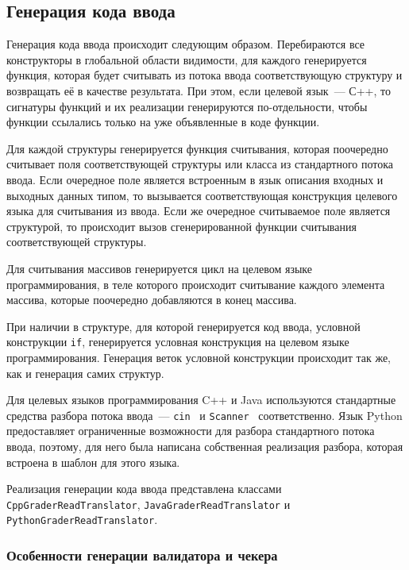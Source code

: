 \documentclass[times,specification,annotation]{style/itmo-student-thesis/itmo-student-thesis}
\begin{document}
\subsection{Генерация кода ввода}

Генерация кода ввода происходит следующим образом. Перебираются все конструкторы в глобальной области видимости, для каждого генерируется функция, которая будет считывать из потока ввода соответствующую структуру и возвращать её в качестве результата. При этом, если целевой язык~--- С++, то сигнатуры функций и их реализации генерируются по-отдельности, чтобы функции ссылались только на уже объявленные в коде функции.

Для каждой структуры генерируется функция считывания, которая поочередно считывает поля соответствующей структуры или класса из стандартного потока ввода. Если очередное поле является встроенным в язык описания входных и выходных данных типом, то вызывается соответствующая конструкция целевого языка для считывания из ввода. Если же очередное считываемое поле является структурой, то происходит вызов сгенерированной функции считывания соответствующей структуры.

Для считывания массивов генерируется цикл на целевом языке программирования, в теле которого происходит считывание каждого элемента массива, которые поочередно добавляются в конец массива.

При наличии в структуре, для которой генерируется код ввода, условной конструкции \texttt{if}, генерируется условная конструкция на целевом языке программирования. Генерация веток условной конструкции происходит так же, как и генерация самих структур.

Для целевых языков программирования C++ и Java используются стандартные средства разбора потока ввода~--- \texttt{cin}~\cite{cppcin} и \texttt{Scanner}~\cite{javascanner} соответственно. Язык Python предоставляет ограниченные возможности для разбора стандартного потока ввода, поэтому, для него была написана собственная реализация разбора, которая встроена в шаблон для этого языка.

Реализация генерации кода ввода представлена классами \texttt{CppGraderReadTranslator}, \texttt{JavaGraderReadTranslator} и \texttt{PythonGraderReadTranslator}.

\subsubsection{Особенности генерации валидатора и чекера}
\end{document}
